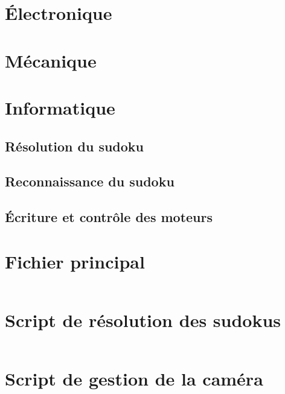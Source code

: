 \documentclass[12pt,a4paper]{report}
\newenvironment{changemargin}[2]{\begin{list}{}{%
\setlength{\topsep}{0pt}%
\setlength{\leftmargin}{0pt}%
\setlength{\rightmargin}{0pt}%
\setlength{\listparindent}{\parindent}%
\setlength{\itemindent}{\parindent}%
\setlength{\parsep}{0pt plus 1pt}%
\addtolength{\leftmargin}{#1}%
\addtolength{\rightmargin}{#2}%
}\item }{\end{list}}
\begin{document}
	\chapter{Électronique}
	\chapter{Mécanique}
	\chapter{Informatique}
	\section{Résolution du sudoku}
	\section{Reconnaissance du sudoku}
	\section{Écriture et contrôle des moteurs}
	

\printbibliography
\nocite{*}
\appendix
\begin{changemargin}{-2cm}{-4cm}
\chapter{Fichier principal}
\inputminted[fontsize=\scriptsize, linenos=true]{Python}{main.py}
\chapter{Script de résolution des sudokus}
\inputminted[fontsize=\scriptsize, linenos=true]{Python}{resolution.py}
\chapter{Script de gestion de la caméra}
\inputminted[fontsize=\scriptsize, linenos=true]{Python}{camera.py}


\end{changemargin}
\end{document}
